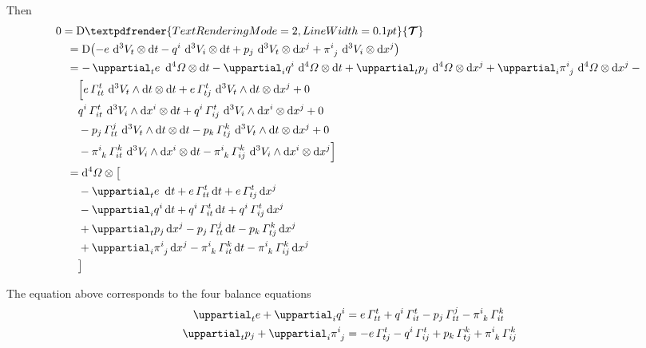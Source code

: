 \documentclass[\ifafour a4paper,12pt,\else a5paper,10pt,\fi%
onecolumn,oneside,article,%
british%
]{memoir}
\theoremstyle{remark}
\theoremstyle{innote}
\renewcommand*{\bm}[1]{\textpdfrender{TextRenderingMode=2,LineWidth=0.1pt}{\boldsymbol{#1}}}
\newcommand*{\de}{\mathop{}\!\uppartial}%
\newcommand*{\di}{\mathop{}\!\mathrm{d}}%
\newcommand*{\Di}{\mathop{}\!\mathrm{D}}%
\renewcommand*{\|}[1][]{\nonscript\:#1\vert\nonscript\:\mathopen{}}
\renewcommand*{\i}{{}\indices}
\newcommand*{\si}[1]{\di{#1}}
\newcommand*{\ttti}[1]{\di^{3}V_{#1}}
\newcommand*{\tttti}[1]{\di^{4}\varOmega_{#1}}
\newcommand*{\yTT}{\bm{\mathcal{T}}}
\begin{document}
Then
\begin{equation}
  \label{eq:div_T31}
  \begin{aligned}
    &0=\Di\yTT
    \\
    &\quad{}= \Di\bigl(
    -e\, \ttti{t}\otimes\si{t}
    -q^{i}\, \ttti{i}\otimes\si{t}
    +p_{j}\, \ttti{t}\otimes\si{x^{j}}
    +\pi\i{^{i}_{j}}\, \ttti{i}\otimes\si{x^{j}}
    \bigr)
    \\
    &\quad{}=
    -\de_{t}e\ \tttti{}\otimes\si{t}
    -\de_{i}q^{i}\, \tttti{}\otimes\si{t}
    +\de_{t}p_{j}\, \tttti{}\otimes\si{x^{j}}
    +\de_{i}\pi\i{^{i}_{j}}\, \tttti{}\otimes\si{x^{j}}
    -{}
    \\
    &\qquad
    \Bigl[
    e\,\varGamma^{t}_{tt}\, \ttti{t}\land\si{t} \otimes \si{t}
    +e\,\varGamma^{t}_{tj}\, \ttti{t}\land\si{t} \otimes \si{x^{j}}
    + 0
    \\
    &\qquad
    q^{i}\, \varGamma^{t}_{it}\, \ttti{i}\land\si{x^{i}} \otimes \si{t}
    +q^{i}\,\varGamma^{t}_{ij}\, \ttti{i}\land\si{x^{i}} \otimes \si{x^{j}}
    + 0
    \\
    &\qquad
    {}-p_{j}\, \varGamma^{j}_{tt}\, \ttti{t}\land\si{t} \otimes \si{t}
    -p_{k}\,\varGamma^{k}_{tj}\, \ttti{t}\land\si{t} \otimes \si{x^{j}}
    + 0
    \\
    &\qquad
    {}-\pi\i{^{i}_{k}}\, \varGamma^{k}_{it}\, \ttti{i}\land\si{x^{i}} \otimes \si{t}
    -\pi\i{^{i}_{k}}\,\varGamma^{k}_{ij}\, \ttti{i}\land\si{x^{i}} \otimes \si{x^{j}}
    \Bigr]
    \\
    &\quad{}=
    \tttti{}\otimes \bigl[{}
    \\
    &\qquad
    -\de_{t}e\ \si{t} 
    + e\,\varGamma^{t}_{tt}\si{t}
    +e\,\varGamma^{t}_{tj}\si{x^{j}}
    \\
    &\qquad
    {}-\de_{i}q^{i}\si{t} 
    +q^{i}\, \varGamma^{t}_{it}\si{t}
    +q^{i}\,\varGamma^{t}_{ij}\si{x^{j}}
    \\
    &\qquad
    {}+\de_{t}p_{j}\si{x^{j}} 
    -p_{j}\, \varGamma^{j}_{tt}\si{t}
    -p_{k}\,\varGamma^{k}_{tj}\si{x^{j}}
    \\
    &\qquad
    {}+\de_{i}\pi\i{^{i}_{j}}\si{x^{j}} 
    -\pi\i{^{i}_{k}}\, \varGamma^{k}_{it}\si{t}
    -\pi\i{^{i}_{k}}\,\varGamma^{k}_{ij}\si{x^{j}}
    \\
    &\qquad{}\bigr]
  \end{aligned}
\end{equation}

The equation above corresponds to the four balance equations
\begin{align}
  \label{eq:div_e}
  \de_{t}e + \de_{i}q^{i} &=
  e\,\varGamma^{t}_{tt}
  +q^{i}\, \varGamma^{t}_{it}
  -p_{j}\, \varGamma^{j}_{tt}
  -\pi\i{^{i}_{k}}\, \varGamma^{k}_{it}
  \\
  \label{eq:div_p}
  \de_{t}p_{j} +  \de_{i}\pi\i{^{i}_{j}} &=
  -e\,\varGamma^{t}_{tj}
  -q^{i}\,\varGamma^{t}_{ij}
  +p_{k}\,\varGamma^{k}_{tj}
  +\pi\i{^{i}_{k}}\,\varGamma^{k}_{ij}
\end{align}
\end{document}
